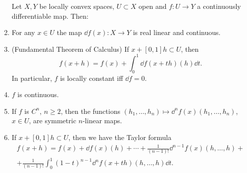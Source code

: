 \begin{lem}
\begin{enumerate}[label=(\roman*)]
    Let $X,Y$ be locally convex spaces, $U\subset X$ open and $f:U\to Y$ a continuously differentiable map. Then:
    \item For any $x\in U$ the map $\dd f(x):X\to Y$ is real linear and continuous.
    \item (Fundamental Theorem of Calculus) If $x+[0,1]h\subset U$, then
    \[f(x+h)=f(x)+\int_0^1 \dd f(x+th)(h)\dd t.\]
    In particular, $f$ is locally constant iff $\dd f=0$.
    \item $f$ is continuous.
    \item If $f$ is $C^n$, $n\geq 2$, then the functions $(h_1,\ldots,h_n)\mapsto \dd^nf(x)(h_1,\ldots,h_n)$, $x\in U$, are symmetric $n$-linear maps.
    \item If $x+[0,1]h\subset U$, then we have the Taylor formula
    \begin{multline}
        f(x+h)=f(x)+\dd f(x)(h)+\cdots +\frac{1}{(n-1)!}\dd^{n-1}f(x)(h,\ldots,h)+\\
        +\frac{1}{(n-1)!}\int_0^1 (1-t)^{n-1}\dd^n f(x+th)(h,\ldots,h)\dd t.
    \end{multline}
\end{enumerate}
\end{lem}

